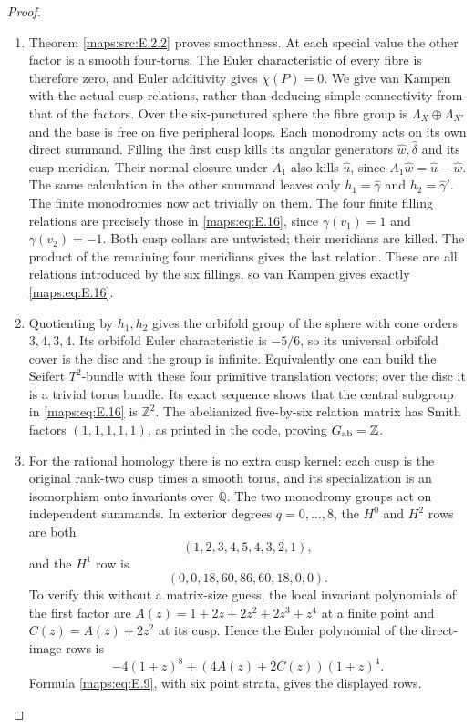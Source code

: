 \begin{proof}
\begin{enumerate}[label=\arabic*.,leftmargin=*]
\item Theorem \ref{maps:src:E.2.2} proves smoothness.  At each special value the other
factor is a smooth four-torus.  The Euler characteristic of every
fibre is therefore zero, and Euler additivity gives $\chi(P)=0$.
We give van Kampen with the actual cusp relations, rather than
deducing simple connectivity from that of the factors.
Over the six-punctured sphere the fibre group is
$\Lambda_X\oplus\Lambda_{X'}$ and the base is free on five
peripheral loops.  Each monodromy acts on its own direct summand.
Filling the first cusp kills its angular generators
$\widehat w,\widehat\delta$ and its cusp meridian.  Their normal
closure under $A_1$ also kills $\widehat u$, since
$A_1\widehat w=\widehat u-\widehat w$.  The same calculation
in the other summand leaves only $h_1=\widehat\gamma$ and
$h_2=\widehat\gamma'$.  The finite monodromies now act trivially
on them.  The four finite filling relations are precisely those
in \eqref{maps:eq:E.16}, since $\gamma(v_1)=1$ and $\gamma(v_2)=-1$.
Both cusp collars are untwisted; their meridians are killed.
The product of the remaining four meridians gives the last
relation.  These are all relations introduced by the six
fillings, so van Kampen gives exactly \eqref{maps:eq:E.16}.

\item Quotienting by $h_1,h_2$ gives the orbifold group of the sphere
with cone orders $3,4,3,4$.  Its orbifold Euler characteristic
is $-5/6$, so its universal orbifold cover is the disc and the
group is infinite.  Equivalently one can build the Seifert
$T^2$-bundle with these four primitive translation vectors; over
the disc it is a trivial torus bundle.  Its exact sequence shows
that the central subgroup in \eqref{maps:eq:E.16} is $\mathbb Z^2$.
The abelianized five-by-six relation matrix has Smith factors
$(1,1,1,1,1)$, as printed in the code, proving $G_{\rm ab}=\mathbb Z$.

\item For the rational homology there is no extra cusp kernel: each
cusp is the original rank-two cusp times a smooth torus, and its
specialization is an isomorphism onto invariants over $\mathbb Q$.
The two monodromy groups act on independent summands.  In exterior
degrees $q=0,\ldots,8$, the $H^0$ and $H^2$ rows are both
\[
 (1,2,3,4,5,4,3,2,1),
\]
and the $H^1$ row is
\[
 (0,0,18,60,86,60,18,0,0).
\]
To verify this without a matrix-size guess, the local invariant
polynomials of the first factor are
$A(z)=1+2z+2z^2+2z^3+z^4$ at a finite point and
$C(z)=A(z)+2z^2$ at its cusp.  Hence the Euler polynomial of
the direct-image rows is
\[
 -4(1+z)^8+(4A(z)+2C(z))(1+z)^4.
\]
Formula \eqref{maps:eq:E.9}, with six point strata, gives the displayed rows.


\end{enumerate}
\end{proof}
